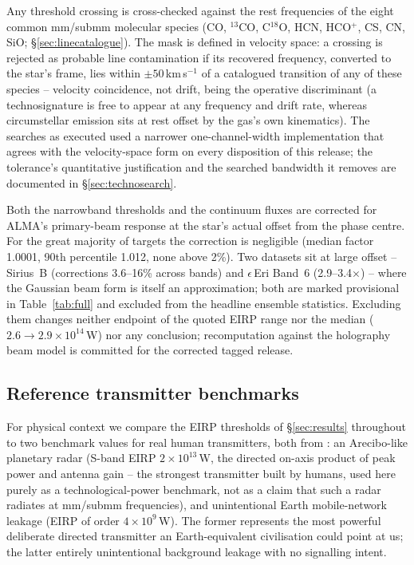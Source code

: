 \documentclass{openjournal}
\begin{document}
Any threshold crossing is cross-checked against the rest frequencies
of the eight common mm/submm molecular species (CO, $^{13}$CO,
C$^{18}$O, HCN, HCO$^{+}$, CS, CN, SiO;
\S\ref{sec:linecatalogue}). The mask is defined in velocity space: a
crossing is rejected as probable line contamination if its recovered
frequency, converted to the star's frame, lies within
$\pm50$\,km\,s$^{-1}$ of a catalogued transition of any of these
species -- velocity coincidence, not drift, being the operative
discriminant (a technosignature is free to appear at any frequency
and drift rate, whereas circumstellar emission sits at rest offset by
the gas's own kinematics). The searches as executed used a narrower
one-channel-width implementation that agrees with the velocity-space
form on every disposition of this release; the tolerance's
quantitative justification and the searched bandwidth it removes are
documented in \S\ref{sec:technosearch}.

Both the narrowband thresholds and the continuum fluxes are corrected
for ALMA's primary-beam response at the star's actual offset from the
phase centre. For the great majority of targets the correction is
negligible (median factor 1.0001, 90th percentile 1.012, none above
2\%). Two datasets sit at large offset -- Sirius~B (corrections
3.6--16\% across bands) and $\epsilon$\,Eri Band~6 (2.9--3.4$\times$)
-- where the Gaussian beam form is itself an approximation; both are
marked provisional in Table~\ref{tab:full} and excluded from the
headline ensemble statistics. Excluding them changes neither endpoint
of the quoted EIRP range nor the median ($2.6\to2.9\times10^{14}$\,W)
nor any conclusion; recomputation against the holography beam model
is committed for the corrected tagged release.
\subsection{Reference transmitter benchmarks}
\label{sec:benchmarks}

For physical context we compare the EIRP thresholds of
\S\ref{sec:results} throughout to two benchmark values for real human
transmitters, both from \citet{EarthDetectingEarth2025}: an
Arecibo-like planetary radar (S-band EIRP $2\times10^{13}$\,W, the
directed on-axis product of peak power and antenna gain -- the
strongest transmitter built by humans, used here purely as a
technological-power benchmark, not as a claim that such a radar
radiates at mm/submm frequencies), and unintentional Earth
mobile-network leakage (EIRP of order $4\times10^{9}$\,W). The former
represents the most powerful deliberate directed transmitter an
Earth-equivalent civilisation could point at us; the latter entirely
unintentional background leakage with no signalling intent.
\end{document}
